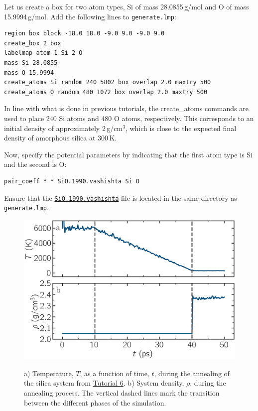 \documentclass[9pt,tutorial]{livecoms}
\newcommand{\lmpcmd}[1]{\colorbox{listing}{\textcolor{command}{\small{#1}}}} %
\newcommand{\flecmd}[1]{\textcolor{command}{\texttt{#1}}} %
\newcommand{\dwlcmd}[1]{\textcolor{download}{\texttt{#1}}} %
\newcommand{\filepath}{https://raw.githubusercontent.com/lammpstutorials/lammpstutorials-article/main/files/}
\begin{document}
Let us create a box for two atom types, \lmpcmd{Si}
of mass 28.0855\,g/mol and \lmpcmd{O} of mass 15.9994\,g/mol.
Add the following lines to \flecmd{generate.lmp}:
\begin{lstlisting}
region box block -18.0 18.0 -9.0 9.0 -9.0 9.0
create_box 2 box
labelmap atom 1 Si 2 O
mass Si 28.0855
mass O 15.9994
create_atoms Si random 240 5802 box overlap 2.0 maxtry 500
create_atoms O random 480 1072 box overlap 2.0 maxtry 500
\end{lstlisting}
{\color{blue}In line with what is done in previous tutorials, the} 
\lmpcmd{create\_atoms} commands are used to place
240 Si atoms and 480 O atoms, respectively.  This corresponds to
an initial density of approximately $2$\,g/cm$^3$, which is close
to the expected final density of amorphous silica at 300\,K.

Now, specify the {\color{blue} potential parameters} by indicating that the first atom type
is \lmpcmd{Si} and the second is \lmpcmd{O}:
\begin{lstlisting}
pair_coeff * * SiO.1990.vashishta Si O
\end{lstlisting}
Ensure that the \href{\filepath tutorial6/SiO.1990.vashishta}{\dwlcmd{SiO.1990.vashishta}}
file is located in the same directory as \flecmd{generate.lmp}.

\begin{figure}
\centering
\includegraphics[width=\linewidth]{GCMC-dimension}\\[-2ex]
\caption{a) Temperature, $T$, as a function of time, $t$, during the annealing
of the silica system from \hyperref[gcmc-silica-label]{Tutorial 6}.
b) System density, $\rho$, during the annealing process.  The vertical dashed lines
mark the transition between the different phases of the simulation.}
\label{fig:GCMC-dimension}
\end{figure}
\end{document}
